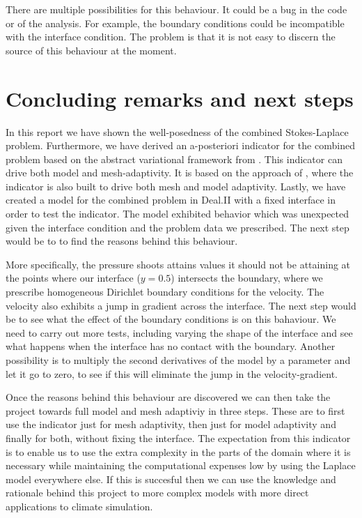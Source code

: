 \documentclass[12pt,a4paper]{article}
\theoremstyle{definition}
\begin{document}
There are multiple possibilities for this behaviour.  It could be a bug in the code or of the analysis.  For example, the boundary conditions could be incompatible with the interface condition. The problem is that it is not easy to discern the source of this behaviour at the moment.



\section{Concluding remarks and next steps}\label{sec_conclusion}
In this report we have shown the well-posedness of the combined Stokes-Laplace problem.  Furthermore, we have derived an a-posteriori indicator for the combined problem based on the abstract variational framework from \cite{verfurth2013posteriori}.  This indicator can drive both model and mesh-adaptivity.  It is based on the approach of \cite{giesselmann2017posteriori}, where the indicator is also built to drive both mesh and model adaptivity.  Lastly, we have created a model  for the combined problem in Deal.II with a fixed interface in order to test the indicator.  The model exhibited  behavior which was unexpected given the interface condition and the problem data we prescribed.  The next step would be to to find the reasons behind this behaviour.  

More specifically, the pressure shoots attains values it should not be attaining at the points where our interface ($y=0.5$) intersects the boundary, where we prescribe homogeneous Dirichlet boundary conditions for the velocity.  The velocity also exhibits a jump in gradient across the interface.  The next step would be to see what the effect of the boundary conditions is on this bahaviour.  We need to carry out more tests, including varying the shape of the interface and see what happens when the interface has no contact with the boundary.  Another possibility is to multiply the second derivatives of the model by a parameter and let it go to zero, to see if this will eliminate the jump in the velocity-gradient.  

Once the reasons behind this behaviour are discovered we can then take the project towards full model and mesh adaptiviy in three steps.  These are to first use the indicator just for mesh adaptivity, then just for model adaptivity and finally for both,  without fixing the interface.  The expectation from this indicator is to enable us to use the extra complexity in the parts of the domain where it is necessary while maintaining the computational expenses low by using the Laplace model everywhere else.  If this is succesful then we can use the knowledge and rationale behind this project to more complex models with more direct applications to climate simulation.
\end{document}
